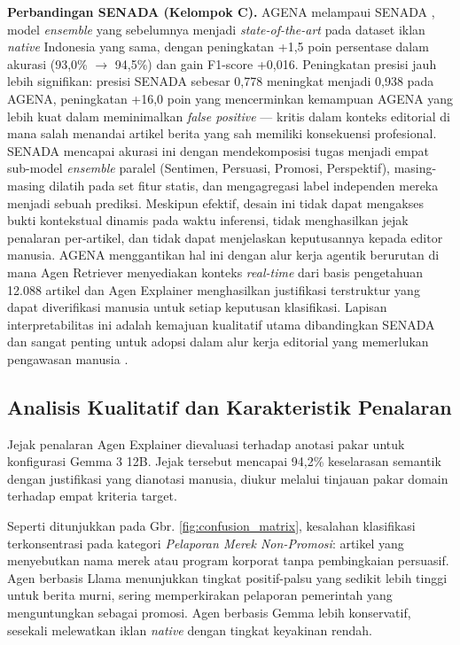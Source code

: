 \documentclass{ieeeaccess}
\begin{document}
\textbf{Perbandingan SENADA (Kelompok C).} AGENA melampaui SENADA \cite{b19}, model \textit{ensemble} yang sebelumnya menjadi \textit{state-of-the-art} pada dataset iklan \textit{native} Indonesia yang sama, dengan peningkatan +1,5 poin persentase dalam akurasi (93,0\% $\to$ 94,5\%) dan gain F1-score +0,016. Peningkatan presisi jauh lebih signifikan: presisi SENADA sebesar 0,778 meningkat menjadi 0,938 pada AGENA, peningkatan +16,0 poin yang mencerminkan kemampuan AGENA yang lebih kuat dalam meminimalkan \textit{false positive} --- kritis dalam konteks editorial di mana salah menandai artikel berita yang sah memiliki konsekuensi profesional. SENADA mencapai akurasi ini dengan mendekomposisi tugas menjadi empat sub-model \textit{ensemble} paralel (Sentimen, Persuasi, Promosi, Perspektif), masing-masing dilatih pada set fitur statis, dan mengagregasi label independen mereka menjadi sebuah prediksi. Meskipun efektif, desain ini tidak dapat mengakses bukti kontekstual dinamis pada waktu inferensi, tidak menghasilkan jejak penalaran per-artikel, dan tidak dapat menjelaskan keputusannya kepada editor manusia. AGENA menggantikan hal ini dengan alur kerja agentik berurutan di mana Agen Retriever menyediakan konteks \textit{real-time} dari basis pengetahuan 12.088 artikel dan Agen Explainer menghasilkan justifikasi terstruktur yang dapat diverifikasi manusia untuk setiap keputusan klasifikasi. Lapisan interpretabilitas ini adalah kemajuan kualitatif utama dibandingkan SENADA dan sangat penting untuk adopsi dalam alur kerja editorial yang memerlukan pengawasan manusia \cite{b20}.



\subsection{Analisis Kualitatif dan Karakteristik Penalaran}
Jejak penalaran Agen Explainer dievaluasi terhadap anotasi pakar untuk konfigurasi Gemma 3 12B. Jejak tersebut mencapai 94,2\% keselarasan semantik dengan justifikasi yang dianotasi manusia, diukur melalui tinjauan pakar domain terhadap empat kriteria target.

Seperti ditunjukkan pada Gbr. \ref{fig:confusion_matrix}, kesalahan klasifikasi terkonsentrasi pada kategori \textit{Pelaporan Merek Non-Promosi}: artikel yang menyebutkan nama merek atau program korporat tanpa pembingkaian persuasif. Agen berbasis Llama menunjukkan tingkat positif-palsu yang sedikit lebih tinggi untuk berita murni, sering memperkirakan pelaporan pemerintah yang menguntungkan sebagai promosi. Agen berbasis Gemma lebih konservatif, sesekali melewatkan iklan \textit{native} dengan tingkat keyakinan rendah.
\end{document}
